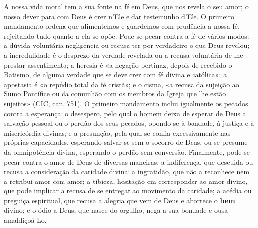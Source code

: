 A nossa vida moral tem a sua fonte na fé em Deus, que nos revela o seu amor; o nosso dever para com Deus é crer n'Ele e dar testemunho d'Ele. O primeiro mandamento ordena que alimentemos e guardemos com prudência a nossa fé, rejeitando tudo quanto a ela se opõe. Pode-se pecar contra a fé de vários modos: a dúvida voluntária negligencia ou recusa ter por verdadeiro o que Deus revelou; a incredulidade é o desprezo da verdade revelada ou a recusa voluntária de lhe prestar assentimento; a heresia é «a negação pertinaz, depois de recebido o Batismo, de alguma verdade que se deve crer com fé divina e católica»; a apostasia é «o repúdio total da fé cristã»; e o cisma, «a recusa da sujeição ao Sumo Pontífice ou da comunhão com os membros da Igreja que lhe estão sujeitos» (CIC, can. 751). O primeiro mandamento inclui igualmente os pecados contra a esperança: o desespero, pelo qual o homem deixa de esperar de Deus a salvação pessoal ou o perdão dos seus pecados, opondo-se à bondade, à justiça e à misericórdia divinas; e a presunção, pela qual se confia excessivamente nas próprias capacidades, esperando salvar-se sem o socorro de Deus, ou se presume da omnipotência divina, esperando o perdão sem conversão. Finalmente, pode-se pecar contra o amor de Deus de diversas maneiras: a indiferença, que descuida ou recusa a consideração da caridade divina; a ingratidão, que não a reconhece nem a retribui amor com amor; a tibieza, hesitação em corresponder ao amor divino, que pode implicar a recusa de se entregar ao movimento da caridade; a acédia ou preguiça espiritual, que recusa a alegria que vem de Deus e aborrece o \textbf{bem} divino; e o ódio a Deus, que nasce do orgulho, nega a sua bondade e ousa amaldiçoá-Lo.

